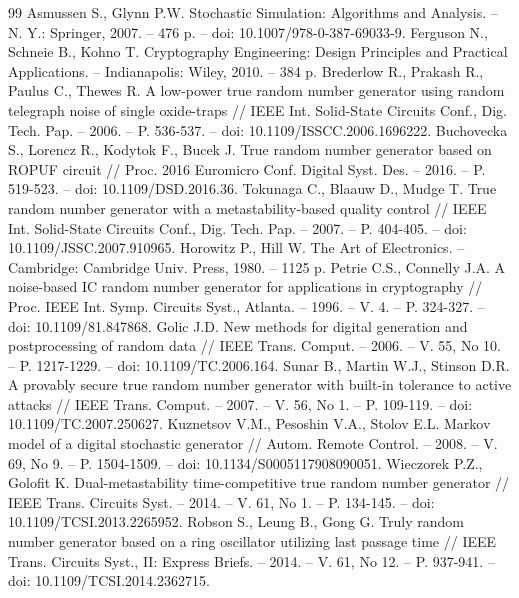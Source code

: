 \documentclass[a4paper,12pt]{article}
\begin{document}
\begin{thebibliography}{99}
 Asmussen S., Glynn P.W. Stochastic Simulation: Algorithms and Analysis. -- N. Y.: Springer, 2007. -- 476 p. -- doi: 10.1007/978-0-387-69033-9.
 Ferguson N., Schneie B., Kohno T. Cryptography Engineering: Design Principles and Practical Applications. -- Indianapolis: Wiley, 2010. -- 384 p.
 Brederlow R., Prakash R., Paulus C., Thewes R. A low-power true random number generator using random telegraph noise of single oxide-traps // IEEE Int. Solid-State Circuits Conf., Dig. Tech. Pap. -- 2006. -- P. 536-537. -- doi: 10.1109/ISSCC.2006.1696222.
 Buchovecka S., Lorencz R., Kodytok F., Bucek J. True random number generator based on ROPUF circuit // Proc. 2016 Euromicro Conf. Digital Syst. Des. -- 2016. -- P. 519-523. -- doi: 10.1109/DSD.2016.36.
 Tokunaga C., Blaauw D., Mudge T. True random number generator with a metastability-based quality control // IEEE Int. Solid-State Circuits Conf., Dig. Tech. Pap. -- 2007. -- P. 404-405. -- doi: 10.1109/JSSC.2007.910965.
 Horowitz P., Hill W. The Art of Electronics. -- Cambridge: Cambridge Univ. Press, 1980. -- 1125 p.
 Petrie C.S., Connelly J.A. A noise-based IC random number generator for applications in cryptography // Proc. IEEE Int. Symp. Circuits Syst., Atlanta. -- 1996. -- V. 4. -- P. 324-327. -- doi: 10.1109/81.847868.
 Golic J.D. New methods for digital generation and postprocessing of random data // IEEE Trans. Comput. -- 2006. -- V. 55, No 10. -- P. 1217-1229. -- doi: 10.1109/TC.2006.164.
 Sunar B., Martin W.J., Stinson D.R. A provably secure true random number generator with built-in tolerance to active attacks // IEEE Trans. Comput. -- 2007. -- V. 56, No 1. -- P. 109-119. -- doi: 10.1109/TC.2007.250627.
 Kuznetsov V.M., Pesoshin V.A., Stolov E.L. Markov model of a digital stochastic generator // Autom. Remote Control. -- 2008. -- V. 69, No 9. -- P. 1504-1509. -- doi: 10.1134/S0005117908090051.
 Wieczorek P.Z., Golofit K. Dual-metastability time-competitive true random number generator // IEEE Trans. Circuits Syst. -- 2014. -- V. 61, No 1. -- P. 134-145. -- doi: 10.1109/TCSI.2013.2265952.
 Robson S., Leung B., Gong G. Truly random number generator based on a ring oscillator utilizing last passage time // IEEE Trans. Circuits Syst., II: Express Briefs. -- 2014. -- V. 61, No 12. -- P. 937-941. -- doi: 10.1109/TCSI.2014.2362715.

\end{thebibliography}
\end{document}

